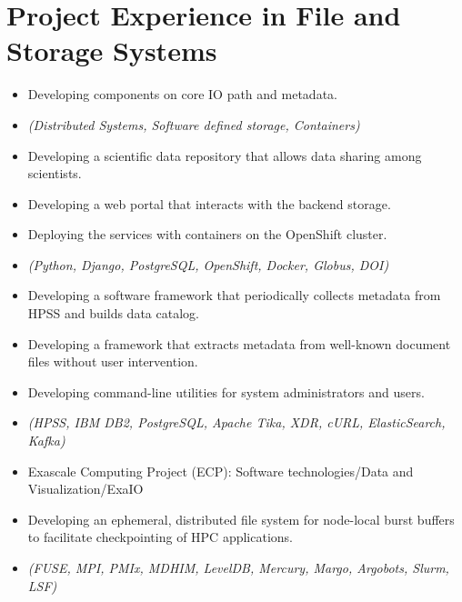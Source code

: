 \section{Project Experience in File and Storage Systems}

\begin{itemize}
 \item {Developing components on core IO path and metadata.}
 \item {\it\small(Distributed Systems, Software defined storage, Containers) }
\end{itemize}

\begin{itemize}
 \item {Developing a scientific data repository that allows data sharing among scientists.}
 \item {Developing a web portal that interacts with the backend storage.}
 \item {Deploying the services with containers on the OpenShift cluster.}
 \item {\it\small(Python, Django, PostgreSQL, OpenShift, Docker, Globus, DOI) }
\end{itemize}

\begin{itemize}
 \item {Developing a software framework that periodically collects metadata from HPSS and builds data catalog.}
 \item {Developing a framework that extracts metadata from well-known document files without user intervention.}
 \item {Developing command-line utilities for system administrators and users.}
 \item {\it\small (HPSS, IBM DB2, PostgreSQL, Apache Tika, XDR, cURL, ElasticSearch, Kafka)}
\end{itemize}

\begin{itemize}
 \item {Exascale Computing Project (ECP): Software technologies/Data and Visualization/ExaIO}
 \item {Developing an ephemeral, distributed file system for node-local burst buffers to facilitate checkpointing of HPC applications.}

 \item {\it\small (FUSE, MPI, PMIx, MDHIM, LevelDB, Mercury, Margo, Argobots, Slurm, LSF)}
\end{itemize}

